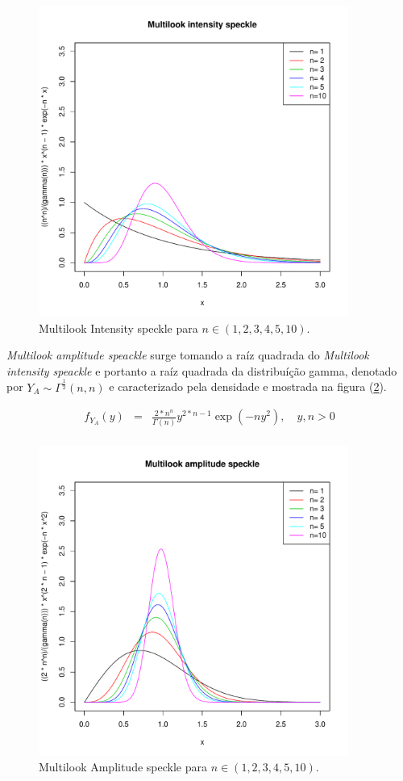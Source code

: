 \documentclass[10pt,a4paper]{article}
\begin{document}
\begin{figure}[!htb]
\centering
\includegraphics[width=4.0in]{fig_eq_fyi_frery_muller_1997.pdf}
	\caption{Multilook Intensity speckle  para $n\in(1,2,3,4,5,10)$.}
\label{sec61fig1}
\end{figure}

{\it Multilook amplitude speackle} surge tomando a raíz quadrada do {\it Multilook intensity speackle} e portanto a raíz quadrada da distribuíção gamma, denotado por $Y_{A}\sim \Gamma^{\frac{1}{2}}(n,n)$ e caracterizado pela densidade e mostrada na figura  (\ref{sec61fig2}).

\begin{equation}\label{sec61eqn2}
\begin{array}{ccc}
	f_{Y_{A}}(y)&=&\frac{2*n^{n}}{\Gamma(n)}y^{2*n-1}\exp\left(-ny^2\right),\quad y,n>0 \\
\end{array}
\end{equation}
\begin{figure}[!htb]
\centering
\includegraphics[width=4.0in]{fig_eq_fya_frery_muller_1997.pdf}
	\caption{Multilook Amplitude speckle  para $n\in(1,2,3,4,5,10)$.}
\label{sec61fig2}
\end{figure}
\end{document}

